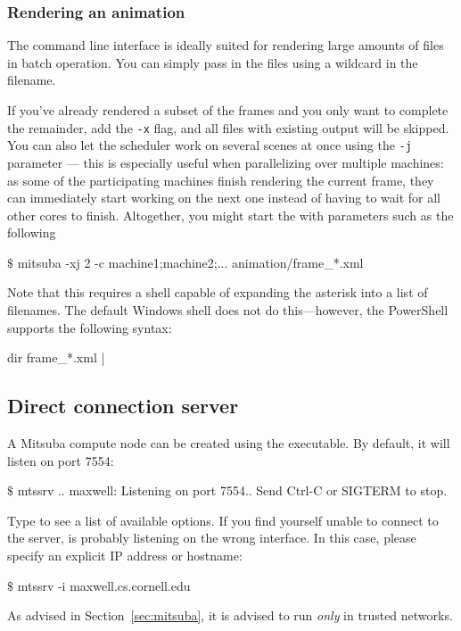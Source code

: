 \subsubsection{Rendering an animation}
The command line interface is ideally suited for rendering large amounts of files in batch
operation. You can simply pass in the files using a wildcard in the filename.

If you've already rendered a subset of the frames and you only want to complete the remainder,
add the \texttt{-x} flag, and all files with existing output will be skipped. You can also
let the scheduler work on several scenes at once using the \texttt{-j} parameter --- this is
especially useful when parallelizing over multiple machines: as some of the participating machines
finish rendering the current frame, they can immediately start working on the next one
instead of having to wait for all other cores to finish. Altogether, you
might start the with parameters such as the following
\begin{shell}
$\texttt{\$}$ mitsuba -xj 2 -c machine1;machine2;...  animation/frame_*.xml
\end{shell}
Note that this requires a shell capable of expanding the asterisk into a list of
filenames. The default Windows shell  does not do this---however,
the PowerShell supports the following syntax:
\begin{shell}
dir frame_*.xml | %
\end{shell}

\subsection{Direct connection server}
\label{sec:mtssrv}
A Mitsuba compute node can be created using the  executable. By default,
it will listen on port 7554:
\begin{shell}
$\texttt{\$}$ mtssrv
..
maxwell: Listening on port 7554.. Send Ctrl-C or SIGTERM to stop.
\end{shell}
Type  to see a list of available options.
If you find yourself unable to connect to the server,  is probably listening on
the wrong interface. In this case, please specify an explicit IP address or hostname:
\begin{shell}
$\texttt{\$}$ mtssrv -i maxwell.cs.cornell.edu
\end{shell}
As advised in Section~\ref{sec:mitsuba}, it is advised to run  \emph{only} in trusted networks.

